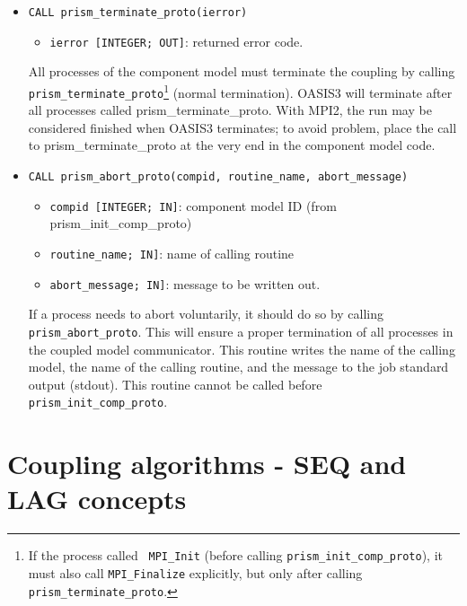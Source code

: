 \begin{itemize}

\item {\tt CALL prism\_terminate\_proto(ierror)}
  \begin{itemize}
  \item {\tt ierror [INTEGER; OUT]}: returned error code.
  \end{itemize}
  All processes of the component model must terminate the coupling by calling {\tt
  prism\_terminate\_proto}\footnote{If the process called {\tt
  MPI\_Init} (before calling {\tt prism\_init\_comp\_proto}), it must
  also call {\tt MPI\_Finalize} explicitly, but only after calling
  {\tt prism\_terminate\_proto}.} (normal termination). OASIS3 will
  terminate after all processes called
  prism\_terminate\_proto. With MPI2, the run may be considered
  finished when OASIS3 terminates; to avoid problem, place the call
  to prism\_terminate\_proto at the very end in the component model code.

\item {\tt CALL prism\_abort\_proto(compid, routine\_name, abort\_message)}
\begin{itemize}
  \item {\tt compid [INTEGER; IN]}: component model ID (from
prism\_init\_comp\_proto) 
  \item {\tt routine\_name; IN]}: name of calling routine
  \item {\tt abort\_message; IN]}: message to be written out.
\end{itemize}

 If a process needs to abort voluntarily, it should do so by
 calling {\tt prism\_abort\_proto}. This will ensure a proper
 termination of all processes in the coupled model communicator. This
 routine writes the name of the calling model, the name of the
 calling routine, and the message to the job standard output (stdout). 
 This routine cannot be called before {\tt prism\_init\_comp\_proto}.

\end{itemize}


\section{Coupling algorithms - SEQ and LAG concepts}
\label{subsubsec_Algoritms}

